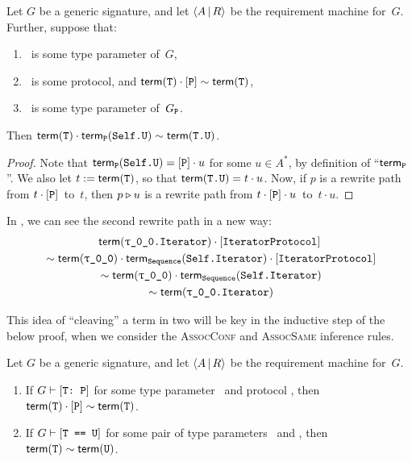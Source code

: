 \documentclass[../generics]{subfiles}
\begin{document}
\begin{lemma}\label{type param composition lemma}
Let $G$ be a generic signature, and let $\langle A\,|\,R\rangle$ be the requirement machine for~$G$. Further, suppose that:
\begin{enumerate}
\item \tT\ is some type parameter of~$G$,
\item \tP\ is some protocol, and $\mathsf{term}(\texttt{T})\cdot[\texttt{P}]\sim\mathsf{term}(\texttt{T})$,
\item \SelfU\ is some type parameter of~$G_{\texttt{P}}$. 
\end{enumerate}
Then $\mathsf{term}(\texttt{T})\cdot\mathsf{term}_{\texttt{P}}(\texttt{Self.U}) \sim \mathsf{term}(\texttt{T.U})$.
\end{lemma}
\begin{proof}
Note that $\mathsf{term}_{\texttt{P}}(\texttt{Self.U})=[\texttt{P}]\cdot u$ for some $u\in A^*$, by definition of ``$\mathsf{term}_{\texttt{P}}$''. We also let $t := \mathsf{term}(\texttt{T})$, so that $\mathsf{term}(\texttt{T.U})=t\cdot u$. Now, if $p$ is a rewrite path from $t\cdot[\texttt{P}]$~to~$t$, then $p\triangleright u$ is a rewrite path from $t\cdot[\texttt{P}]\cdot u$~to~$t\cdot u$.
\end{proof}

\begin{example}
In , we can see the second rewrite path in a new way:
\begin{gather*}
\Term(\texttt{\rT.Iterator})\cdot\pIterator\\
{} \sim \Term(\rT) \cdot \TermP{Sequence}(\texttt{Self.Iterator}) \cdot \pIterator\\
{} \sim \Term(\rT) \cdot \TermP{Sequence}(\texttt{Self.Iterator})\\
{} \sim \Term(\texttt{\rT.Iterator})
\end{gather*}
\end{example}

This idea of ``cleaving'' a term in two will be key in the inductive step of the below proof, when we consider the \textsc{AssocConf} and \textsc{AssocSame} inference rules.

\newcommand{\Path}{\mathsf{path}\,}

\begin{theorem}\label{derivation to path swift}
Let $G$ be a generic signature, and let $\langle A\,|\,R\rangle$ be the requirement machine for~$G$.
\begin{enumerate}
\item If $G\vdash[\texttt{T:~P}]$ for some type parameter \tT\ and protocol \tP, then $\mathsf{term}(\texttt{T})\cdot[\texttt{P}] \sim \mathsf{term}(\texttt{T})$.
\item If $G\vdash[\texttt{T == U}]$ for some pair of type parameters \tT\ and \tU, then $\mathsf{term}(\texttt{T}) \sim \mathsf{term}(\texttt{U})$.
\end{enumerate}
\end{theorem}
\end{document}
